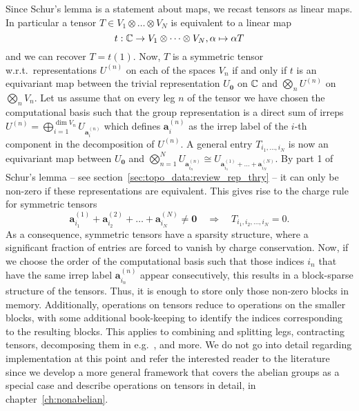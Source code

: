 Since Schur's lemma is a statement about maps, we recast tensors as linear maps.
%
In particular a tensor $T \in V_1 \otimes \dots \otimes V_N$ is equivalent to a linear map
\begin{equation}
    t: \mathbb{C} \to V_1 \otimes \dots \otimes V_N , \alpha \mapsto \alpha T
\end{equation}
and we can recover $T = t(1)$.
%
Now, $T$ is a symmetric tensor w.r.t.~representations $U^{(n)}$ on each of the spaces $V_n$ if and only if $t$ is an equivariant map between the trivial representation $U_\mathbf{0}$ on $\mathbb{C}$ and $\bigotimes_n U^{(n)}$ on $\bigotimes_n V_n$.
%
Let us assume that on every leg $n$ of the tensor we have chosen the computational basis such that the group representation is a direct sum of irreps $U^{(n)} = \bigoplus_{i=1}^{\dim V_n} U_{\mathbf{a}^{(n)}_i}$ which defines $\mathbf{a}^{(n)}_i$ as the irrep label of the $i$-th component in the decomposition of $U^{(n)}$.
%
A general entry $T_{i_1,\dots,i_N}$ is now an equivariant map between $U_\mathbf{0}$ and $\bigotimes_{n=1}^N U_{\mathbf{a}^{(n)}_{i_n}} \cong U_{\mathbf{a}^{(1)}_{i_1} + \dots + \mathbf{a}^{(N)}_{i_N}}$.
%
By part 1 of Schur's lemma -- see section~\ref{sec:topo_data:review_rep_thry} -- it can only be non-zero if these representations are equivalent.
%
This gives rise to the charge rule for symmetric tensors
\begin{equation}
    \mathbf{a}^{(1)}_{i_1} + \mathbf{a}^{(2)}_{i_2} + \dots + \mathbf{a}^{(N)}_{i_N} \neq \mathbf{0}
    \quad \Rightarrow \quad
    T_{i_1,i_2,\dots, i_N} = 0
    .
\end{equation}
%
As a consequence, symmetric tensors have a sparsity structure, where a significant fraction of entries are forced to vanish by charge conservation.
%
Now, if we choose the order of the computational basis such that those indices $i_n$ that have the same irrep label $\mathbf{a}^{(n)}_{i_n}$ appear consecutively, this results in a block-sparse structure of the tensors.
%
Thus, it is enough to store only those non-zero blocks in memory.
%
Additionally, operations on tensors reduce to operations on the smaller blocks, with some additional book-keeping to identify the indices corresponding to the resulting blocks.
%
This applies to combining and splitting legs, contracting tensors, decomposing them in e.g.~, and more.
%
We do not go into detail regarding implementation at this point and refer the interested reader to the literature~\cite{singh2010b, singh2011a, hauschild2018b} since we develop a more general framework that covers the abelian groups as a special case and describe operations on tensors in detail, in chapter~\ref{ch:nonabelian}.

